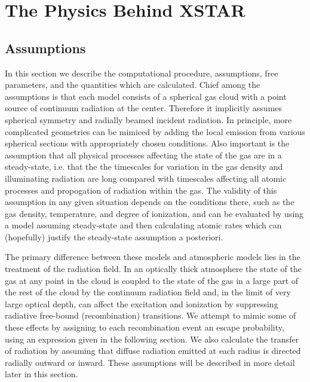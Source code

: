 \chapter{The Physics Behind XSTAR}
\label{sec:physics}


\section{Assumptions}

In this section we describe the computational procedure,
assumptions, free parameters, and the quantities which are calculated.  
Chief among the assumptions is that each model consists 
of a spherical gas cloud with a point  
source of continuum radiation at the center.  Therefore it
implicitly assumes spherical symmetry and radially 
beamed incident radiation.  In principle, more complicated geometries
can be mimiced by adding the local emission from  various 
spherical sections with appropriately chosen conditions. 
Also important is the assumption that all physical processes 
affecting the state of the gas are in a steady-state, i.e. that 
the the timescales for variation in the gas density and 
illuminating radiation are long compared with timescales affecting 
all atomic processes and propogation of radiation within the gas.
The validity of this assumption in any given situation depends on 
the conditions there, such as the gas density, temperature, and 
degree of ionization, and can be evaluated by using a model 
assuming steady-state and then calculating atomic rates which can
(hopefully) justify the steady-state assumption a posteriori.

The primary difference between these models and atmospheric models lies
in the treatment of the radiation field.
In an optically thick atmosphere the state of the gas
at any point in the cloud is coupled to the state of the gas in a
large part of the   rest of the cloud by the continuum 
radiation field and, in the limit of very large optical depth, 
can affect the excitation and ionization by suppressing radiative 
free-bound (recombination) transitions.  We attempt to mimic some of 
these effects by assigning to each recombination event an escape 
probability, using an expression given in the following section.
We also calculate the transfer of radiation by assuming that diffuse
radiation emitted at each radius is directed radially outward or 
inward.  These assumptions will be described in more detail later in this
section.

